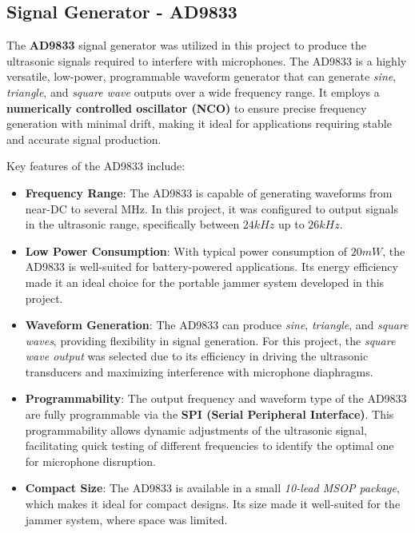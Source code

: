 \subsection{Signal Generator - AD9833}

The \textbf{AD9833} \cite{ad9833} signal generator was utilized in this project to produce the ultrasonic signals required to interfere with microphones. The AD9833 is a highly versatile, low-power, programmable waveform generator that can generate \textit{sine}, \textit{triangle}, and \textit{square wave} outputs over a wide frequency range. It employs a \textbf{numerically controlled oscillator (NCO)} to ensure precise frequency generation with minimal drift, making it ideal for applications requiring stable and accurate signal production.

Key features of the AD9833 include:

\begin{itemize}
    \item \textbf{Frequency Range}: The AD9833 is capable of generating waveforms from near-DC to several MHz. In this project, it was configured to output signals in the ultrasonic range, specifically between $24 kHz$ up to $26 kHz$.
    
    \item \textbf{Low Power Consumption}: With typical power consumption of $20 mW$, the AD9833 is well-suited for battery-powered applications. Its energy efficiency made it an ideal choice for the portable jammer system developed in this project.
    
    \item \textbf{Waveform Generation}: The AD9833 can produce \textit{sine}, \textit{triangle}, and \textit{square waves}, providing flexibility in signal generation. For this project, the \textit{square wave output} was selected due to its efficiency in driving the ultrasonic transducers and maximizing interference with microphone diaphragms.
    
    \item \textbf{Programmability}: The output frequency and waveform type of the AD9833 are fully programmable via the \textbf{SPI (Serial Peripheral Interface)}. This programmability allows dynamic adjustments of the ultrasonic signal, facilitating quick testing of different frequencies to identify the optimal one for microphone disruption.
    
    \item \textbf{Compact Size}: The AD9833 is available in a small \textit{10-lead MSOP package}, which makes it ideal for compact designs. Its size made it well-suited for the jammer system, where space was limited.
\end{itemize}

